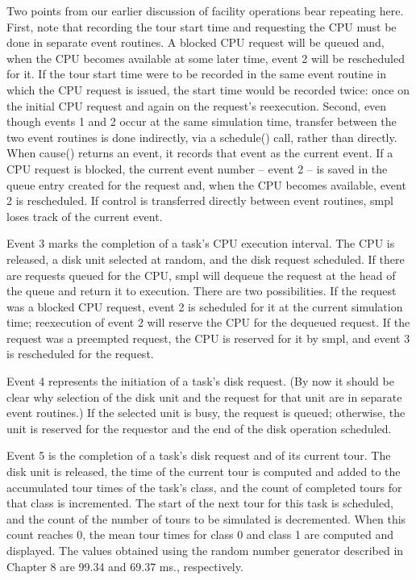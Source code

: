 Two points from our earlier discussion of facility operations bear repeating
here. First, note that recording the tour start time and requesting the CPU
must be done in separate event routines. A blocked CPU request will be queued
and, when the CPU becomes available at some later time, event 2 will be
rescheduled for it. If the tour start time were to be recorded in the same
event routine in which the CPU request is issued, the start time would be
recorded twice: once on the initial CPU request and again on the request's
reexecution. Second, even though events 1 and 2 occur at the same simulation
time, transfer between the two event routines is done indirectly, via a
\noindent schedule() call, rather than directly. When cause() returns an event, it
records that event as the current event. If a CPU request is blocked, the
current event number -- event 2 -- is saved in the queue entry created for the
request and, when the CPU becomes available, event 2 is rescheduled. If
control is transferred directly between event routines, smpl loses track of the
current event.

Event 3 marks the completion of a task's CPU execution interval. The CPU is
released, a disk unit selected at random, and the disk request scheduled. If
there are requests queued for the CPU, smpl will dequeue the request at the
head of the queue and return it to execution. There are two possibilities. If
the request was a blocked CPU request, event 2 is scheduled for it at the
current simulation time; reexecution of event 2 will reserve the CPU for the
dequeued request. If the request was a preempted request, the CPU is reserved
for it by smpl, and event 3 is rescheduled for the request.

Event 4 represents the initiation of a task's disk request. (By now it should
be clear why selection of the disk unit and the request for that unit are in
separate event routines.) If the selected unit is busy, the request is queued;
otherwise, the unit is reserved for the requestor and the end of the disk
operation scheduled.

Event 5 is the completion of a task's disk request and of its current tour. The
disk unit is released, the time of the current tour is computed and added to
the accumulated tour times of the task's class, and the count of completed
tours for that class is incremented. The start of the next tour for this task is
scheduled, and the count of the number of tours to be simulated is
decremented. When this count reaches 0, the mean tour times for class 0 and
class 1 are computed and displayed. The values obtained using the random
number generator described in Chapter 8 are 99.34 and 69.37 ms.,
respectively.

